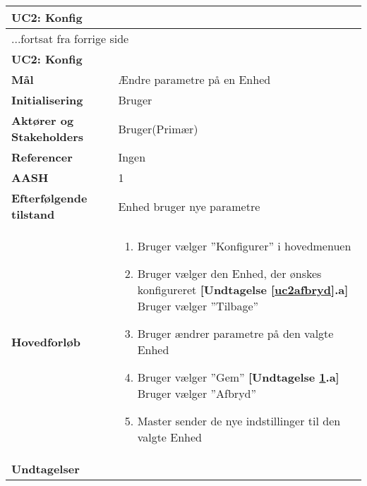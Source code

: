 \begin{center} \centering \label{UC2}
	\begin{longtable}{|p{5cm}|p{9cm}|}  %
	\hline
		\multicolumn{2}{|l|}{\textbf{UC2: Konfig}} \\\hline %
		\endfirsthead
		
		\multicolumn{2}{l}{...fortsat fra forrige side} \\ \hline %
		\multicolumn{2}{|l|}{\textbf{UC2: Konfig}} \\\hline %
		\endhead	
		
		\textbf{Mål}								&Ændre parametre på en Enhed		\\\hline
		\textbf{Initialisering}					&Bruger							\\\hline
		\textbf{Aktører og Stakeholders}			&Bruger(Primær)					\\\hline
		\textbf{Referencer}						&Ingen							\\\hline
		\textbf{AASH}							&1								\\\hline
		\textbf{Efterfølgende tilstand}			&Enhed bruger nye parametre		\\\hline
		\textbf{Hovedforløb}					
			&\begin{enumerate}
	
				\item Bruger vælger ''Konfigurer'' i hovedmenuen
				
				\item \label{uc2afbryd}Bruger vælger den Enhed, der ønskes konfigureret\newline
				\textbf{[Undtagelse \ref{uc2afbryd}.a]} \newline
					Bruger vælger ''Tilbage''
				
				\item \label{uc2afbryd2}Bruger ændrer parametre på den valgte Enhed
				\item \label{uc2afbryd3} Bruger vælger ''Gem''\newline
				\textbf{[Undtagelse \ref{uc2afbryd3}.a]} \newline
					Bruger vælger ''Afbryd''
				
				\item Master sender de nye indstillinger til den valgte Enhed
			
	
			\end{enumerate}\\\hline
		\textbf{Undtagelser}
			&\begin{enumerate}[label=\ref{uc2afbryd}.a]
				

\end{enumerate}
\end{longtable}
\end{center}
